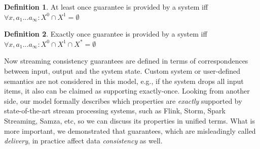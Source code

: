 \documentclass[sigconf]{acmart}
\theoremstyle{definition}
\newtheorem{definition}{Definition}
\begin{document}
\begin{definition}{At least once}
guarantee is provided by a system iff $\forall{x,a_1...a_\infty}:X^{0}\cap{X^{1}}=\emptyset$
\end{definition}

\begin{definition}{Exactly once}
guarantee is provided by a system iff $\forall{x,a_1...a_\infty}:X^{0}\cap{X^{1}}\cap{X^{*}}=\emptyset$
\end{definition}

Now streaming consistency guarantees are defined in terms of correspondences between input, output and the system state. Custom system or user-defined semantics are not considered in this model, e.g., if the system drops all input items, it also can be claimed as supporting exactly-once. Looking from another side, our model formally describes which properties are {\em exactly} supported by state-of-the-art stream processing systems, such as Flink, Storm, Spark Streaming, Samza, etc, so we can discuss its properties in unified terms. What is more important, we demonstrated that guarantees, which are misleadingly called {\em delivery}, in practice affect data {\em consistency} as well.










\end{document}
